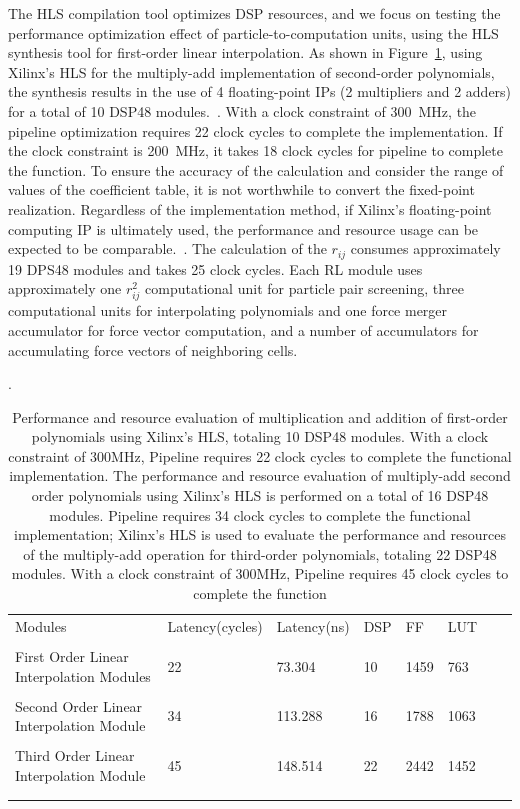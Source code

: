 \documentclass{article}
\begin{document}
The HLS compilation tool optimizes DSP resources, and we focus on testing the 
performance optimization effect of particle-to-computation units, using the 
HLS synthesis tool for first-order linear interpolation.
As shown in Figure~\ref{HLS}, using Xilinx's HLS for the multiply-add 
implementation of second-order 
polynomials, the synthesis results in the use of 4 floating-point IPs 
(2 multipliers and 2 adders) for a total of 10 DSP48 modules.~\cite{fpga18}. 
With a clock constraint of 300~MHz, the pipeline optimization requires 22 clock 
cycles to complete the implementation.
If the clock constraint is 200~MHz, it takes 18 clock cycles for pipeline to 
complete the function.
To ensure the accuracy of the calculation and consider the range of values of 
the coefficient table, it is not worthwhile to convert the fixed-point 
realization.
Regardless of the implementation method, if Xilinx's floating-point computing 
IP is ultimately used, the performance and resource usage can be expected to 
be comparable.~\cite{fpga29}.
The calculation of the $r_{ij}$ consumes approximately 19 DPS48 modules and 
takes 25 clock cycles.
Each RL module uses approximately one $r_{ij}^2$ computational unit for particle 
pair screening, three computational units for interpolating polynomials and one 
force merger accumulator for force vector computation, and a number of 
accumulators for accumulating force vectors of neighboring cells.


\begin{table}[!ht]
	\centering
		\caption[Performance and Resource Evaluation]{Performance and resource evaluation of multiplication and addition of first-order polynomials using Xilinx's HLS, totaling 10 DSP48 modules. With a clock constraint of 300MHz, Pipeline requires 22 clock cycles to complete the functional implementation. The performance and resource evaluation of multiply-add second order polynomials using Xilinx's HLS is performed on a total of 16 DSP48 modules. Pipeline requires 34 clock cycles to complete the functional implementation; Xilinx's HLS is used to evaluate the performance and resources of the multiply-add operation for third-order polynomials, totaling 22 DSP48 modules. With a clock constraint of 300MHz, Pipeline requires 45 clock cycles to complete the function}.
	\begin{tabular*}{\hsize}{@{}@{\extracolsep{\fill}}llllllll@{}}
		\toprule
		Modules&Latency(cycles) & Latency(ns) & DSP &FF &LUT \\\\ 
		\midrule
	First Order Linear Interpolation Modules 
        &22 &73.304 & 10 & 1459 & 763\\\\
        Second Order Linear Interpolation Module &34 &113.288 & 16 & 1788 & 1063\\\\
        Third Order Linear Interpolation Module &45 &148.514 & 22 & 2442 & 1452\\\\ 
	\bottomrule
	\label{HLS}
	\end{tabular*}

\end{table}
\end{document}
